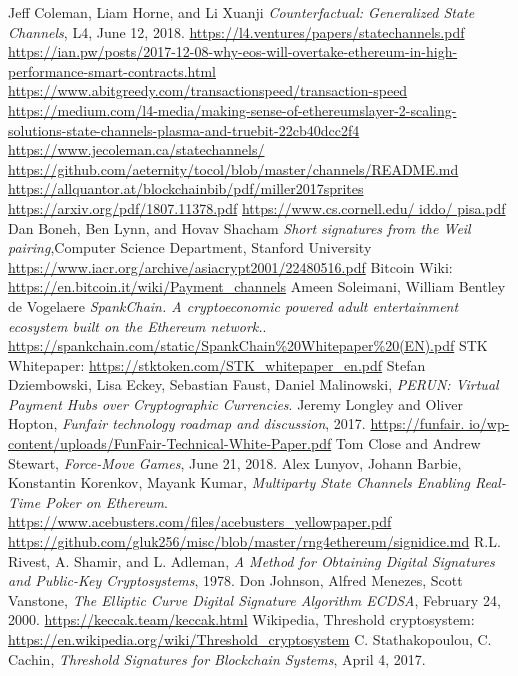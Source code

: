 \documentclass[tikz, 12pt]{article}
\theoremstyle{definition}
\theoremstyle{remark}
\begin{document}

	\begin{thebibliography}{9}
Jeff Coleman, Liam Horne, and Li Xuanji \emph{Counterfactual: Generalized State Channels}, L4, June 12, 2018. \url{https://l4.ventures/papers/statechannels.pdf}
 \url{https://ian.pw/posts/2017-12-08-why-eos-will-overtake-ethereum-in-high-performance-smart-contracts.html}
 \url{https://www.abitgreedy.com/transactionspeed/transaction-speed}
 \url{https://medium.com/l4-media/making-sense-of-ethereumslayer-2-scaling-solutions-state-channels-plasma-and-truebit-22cb40dcc2f4}
 \url{https://www.jecoleman.ca/statechannels/}
 \url{https://github.com/aeternity/tocol/blob/master/channels/README.md}
 \url{https://allquantor.at/blockchainbib/pdf/miller2017sprites}
 \url{https://arxiv.org/pdf/1807.11378.pdf}
 \url{https://www.cs.cornell.edu/ iddo/ pisa.pdf}
Dan Boneh, Ben Lynn, and Hovav Shacham \emph{Short signatures from the Weil pairing},Computer Science Department, Stanford University \url{https://www.iacr.org/archive/asiacrypt2001/22480516.pdf}
 Bitcoin Wiki: \url{https://en.bitcoin.it/wiki/Payment_channels}
 Ameen Soleimani, William Bentley de Vogelaere \emph{SpankChain. A cryptoeconomic powered adult entertainment ecosystem built on the Ethereum network.}. \url{https://spankchain.com/static/SpankChain\%20Whitepaper\%20(EN).pdf}
 STK Whitepaper: \url{https://stktoken.com/STK_whitepaper_en.pdf}
 Stefan Dziembowski, Lisa Eckey, Sebastian Faust, Daniel Malinowski, \emph{PERUN: Virtual Payment Hubs over Cryptographic Currencies}.
 Jeremy Longley and Oliver Hopton, \emph{Funfair technology roadmap and discussion}, 2017. \url{https://funfair.
io/wp-content/uploads/FunFair-Technical-White-Paper.pdf}
 Tom Close and Andrew Stewart, \emph{Force-Move Games}, June 21, 2018.
 Alex Lunyov, Johann Barbie, Konstantin Korenkov, Mayank Kumar, \emph{Multiparty State Channels
Enabling Real-Time Poker on Ethereum}. \url{https://www.acebusters.com/files/acebusters_yellowpaper.pdf}
 \url{https://github.com/gluk256/misc/blob/master/rng4ethereum/signidice.md}
 R.L. Rivest, A. Shamir, and L. Adleman, \emph{A Method for Obtaining Digital Signatures and Public-Key Cryptosystems}, 1978.
 Don Johnson, Alfred Menezes, Scott Vanstone, \emph{The Elliptic Curve Digital Signature Algorithm ECDSA}, February 24, 2000.
 \url{https://keccak.team/keccak.html}
 Wikipedia, Threshold cryptosystem: \url{https://en.wikipedia.org/wiki/Threshold_cryptosystem}
 C. Stathakopoulou, C. Cachin, \emph{Threshold Signatures for Blockchain Systems}, April 4, 2017. 
\end{thebibliography}


		
\end{document}
